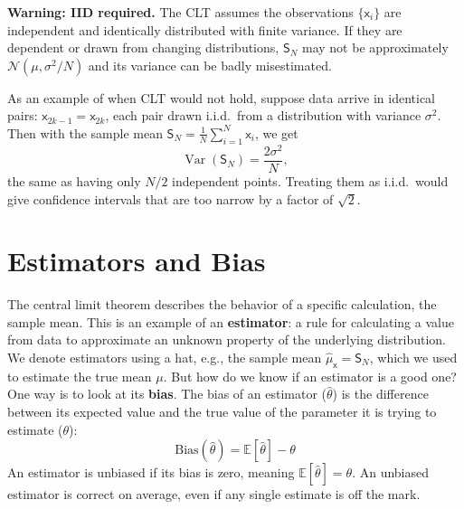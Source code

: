 \begin{warningBox}
    \textbf{Warning: IID required.} The CLT assumes the observations $\{\mathsf{x}_i\}$ are independent and identically distributed with finite variance. If they are dependent or drawn from changing distributions, $\mathsf{S}_N$ may not be approximately $\mathcal{N}(\mu,\sigma^2/N)$ and its variance can be badly misestimated.
    
    As an example of when CLT would not hold, suppose data arrive in identical pairs: $\mathsf{x}_{2k-1}=\mathsf{x}_{2k}$, each pair drawn i.i.d.\ from a distribution with variance $\sigma^2$. Then with the sample mean $\mathsf{S}_N = \frac{1}{N}\sum_{i=1}^N \mathsf{x}_i$, we get
    \begin{equation}
        \operatorname{Var}(\mathsf{S}_N)=\frac{2\sigma^2}{N},
    \end{equation}
    the same as having only $N/2$ independent points. Treating them as i.i.d.\ would give confidence intervals that are too narrow by a factor of $\sqrt{2}$.
\end{warningBox}
    

\section{Estimators and Bias}
The central limit theorem describes the behavior of a specific calculation, the sample mean. This is an example of an \textbf{estimator}: a rule for calculating a value from data to approximate an unknown property of the underlying distribution. We denote estimators using a hat, e.g., the sample mean $\hat{\mu}_{\mathsf{x}} = \mathsf{S}_N$, which we used to estimate the true mean $\mu$. But how do we know if an estimator is a good one? One way is to look at its \textbf{bias}. The bias of an estimator ($\hat{\theta}$) is the difference between its expected value and the true value of the parameter it is trying to estimate ($\theta$):
\begin{equation}
    \text{Bias}(\hat{\theta}) = \mathbb{E}[\hat{\theta}] - \theta
\end{equation}
An estimator is unbiased if its bias is zero, meaning $\mathbb{E}[\hat{\theta}] = \theta$. An unbiased estimator is correct on average, even if any single estimate is off the mark.

